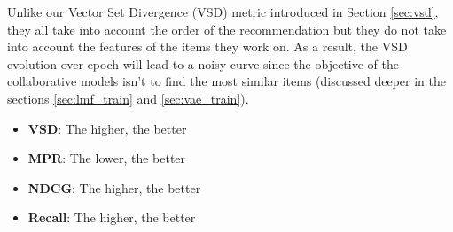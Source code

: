 Unlike our Vector Set Divergence (VSD) metric introduced in Section \ref{sec:vsd}, they all take into account the order of the recommendation but they do not take into account the features of the items they work on. As a result, the VSD evolution over epoch will lead to a noisy curve since the objective of the collaborative models isn't to find the most similar items (discussed deeper in the sections \ref{sec:lmf_train} and \ref{sec:vae_train}).

\begin{itemize}
    \item \textbf{VSD}: The higher, the better
    \item \textbf{MPR}: The lower, the better
    \item \textbf{NDCG}: The higher, the better
    \item \textbf{Recall}: The higher, the better
\end{itemize}
